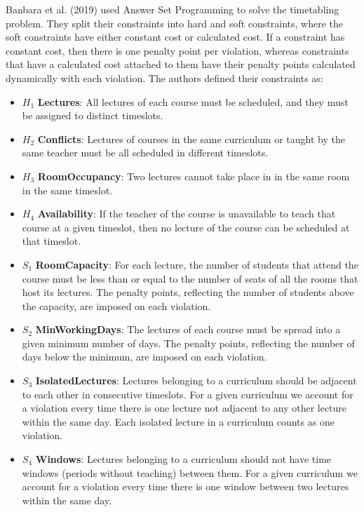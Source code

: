 Banbara et al. (2019)\cite{asp_example} used Answer Set Programming to solve the 
timetabling problem.
They split their constraints into hard and soft constraints, where the soft
constraints have either constant cost or calculated cost.
If a constraint has constant cost, then there is one penalty point per
violation, whereas constraints that have a calculated cost attached to them
have their penalty points calculated dynamically with each violation.
The authors defined their constraints as:
\begin{itemize}
	\item \( H_1 \) \textbf{Lectures}: All lectures of each course must be 
		scheduled, and they must be assigned to distinct timeslots.
	\item \( H_2 \) \textbf{Conflicts}: Lectures of courses in the same 
		curriculum or taught by the same teacher must be all scheduled in 
		different timeslots.
	\item \( H_3 \) \textbf{RoomOccupancy}: Two lectures cannot take place in 
		in the same room in the same timeslot.
	\item \( H_4 \) \textbf{Availability}: If the teacher of the course is 
		unavailable to teach that course at a given timeslot, then no lecture of
		the course can be scheduled at that timeslot.
	\item \( S_1 \) \textbf{RoomCapacity}: For each lecture, the number of
		students that attend the course must be less than or equal to the number
		of seats of all the rooms that host its lectures.
		The penalty points, reflecting the number of students above the
		capacity, are imposed on each violation.
	\item \( S_2 \) \textbf{MinWorkingDays}: The lectures of each course must be
		spread into a given minimum number of days.
		The penalty points, reflecting the number of days below the minimum, are
		imposed on each violation.
	\item \( S_3 \) \textbf{IsolatedLectures}: Lectures belonging to a
		curriculum should be adjacent to each other in consecutive timeslots.
		For a given curriculum we account for a violation every time there is 
		one lecture not adjacent to any other lecture within the same day.
		Each isolated lecture in a curriculum counts as one violation.
	\item \( S_4 \) \textbf{Windows}: Lectures belonging to a curriculum should 
		not have time windows (periods without teaching) between them.
		For a given curriculum we account for a violation every time there is
		one window between two lectures within the same day.

\end{itemize}
